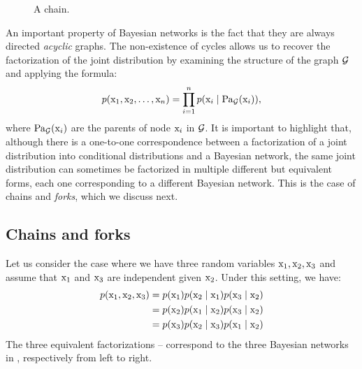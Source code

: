 \begin{figure}
    \centering
    \caption{A chain.}
    \label{fig:chain_bayesian_net}
\end{figure}
An important property of Bayesian networks is the fact that they are always directed \emph{acyclic} graphs. The non-existence of cycles allows us to recover the factorization of the joint distribution by examining the structure of the graph ${\mathcal{G}}$ and applying the formula:
\begin{equation}
    p({\textnormal{x}}_1, {\textnormal{x}}_2, \dots, {\textnormal{x}}_n) = \prod_{i=1}^n p({\textnormal{x}}_i \mid \mathrm{Pa}_{\mathcal{G}}({\textnormal{x}}_i)),
\end{equation}
where $\mathrm{Pa}_{\mathcal{G}}({\textnormal{x}}_i)$ are the parents of node ${\textnormal{x}}_i$ in ${\mathcal{G}}$. It is important to highlight that, although there is a one-to-one correspondence between a factorization of a joint distribution into conditional distributions and a Bayesian network, the same joint distribution can sometimes be factorized in multiple different but equivalent forms, each one corresponding to a different Bayesian network. This is the case of chains and \emph{forks}, which we discuss next.

\subsection{Chains and forks}
\label{sec:chains_forks}
Let us consider the case where we have three random variables ${\textnormal{x}}_1, {\textnormal{x}}_2, {\textnormal{x}}_3$ and assume that ${\textnormal{x}}_1$ and ${\textnormal{x}}_3$ are independent given ${\textnormal{x}}_2$. Under this setting, we have:
\begin{align}
    p({\textnormal{x}}_1, {\textnormal{x}}_2, {\textnormal{x}}_3) &= p({\textnormal{x}}_1) p({\textnormal{x}}_2 \mid {\textnormal{x}}_1) p({\textnormal{x}}_3 \mid {\textnormal{x}}_2) \label{eq:chain}\\
    &= p({\textnormal{x}}_2) p({\textnormal{x}}_1 \mid {\textnormal{x}}_2) p({\textnormal{x}}_3 \mid {\textnormal{x}}_2) \label{eq:fork}\\
    &= p({\textnormal{x}}_3) p({\textnormal{x}}_2 \mid {\textnormal{x}}_3) p({\textnormal{x}}_1 \mid {\textnormal{x}}_2) \label{eq:reversed_chain}
\end{align}
The three equivalent factorizations  --  correspond to the three Bayesian networks in , respectively from left to right.

